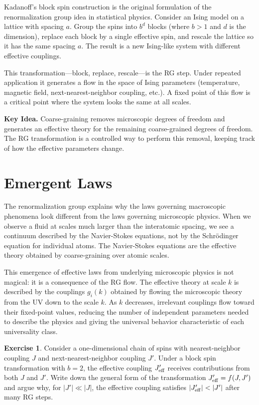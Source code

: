 \documentclass[12pt,a4paper,oneside]{book}
\theoremstyle{definition}
\newtheorem{exercise}{Exercise}[chapter]
\theoremstyle{plain}
\theoremstyle{remark}
\newenvironment{keyidea}{%
  \begin{mdframed}[linecolor=black!40,backgroundcolor=black!4,
    leftmargin=0pt,rightmargin=0pt,innerleftmargin=10pt,
    innerrightmargin=10pt,innertopmargin=8pt,innerbottommargin=8pt]
  \noindent\textbf{Key Idea.}\space}{%
  \end{mdframed}}
\begin{document}
Kadanoff's block spin construction is the original formulation of the
renormalization group idea in statistical physics. Consider an Ising model
on a lattice with spacing $a$. Group the spins into $b^d$ blocks (where
$b > 1$ and $d$ is the dimension), replace each block by a single effective
spin, and rescale the lattice so it has the same spacing $a$. The result is a
new Ising-like system with different effective couplings.

This transformation---block, replace, rescale---is the RG step. Under repeated
application it generates a flow in the space of Ising parameters (temperature,
magnetic field, next-nearest-neighbor coupling, etc.). A fixed point of this
flow is a critical point where the system looks the same at all scales.

\begin{keyidea}
Coarse-graining removes microscopic degrees of freedom and generates an
effective theory for the remaining coarse-grained degrees of freedom.
The RG transformation is a controlled way to perform this removal, keeping
track of how the effective parameters change.
\end{keyidea}

\section{Emergent Laws}

The renormalization group explains why the laws governing macroscopic phenomena
look different from the laws governing microscopic physics. When we observe a
fluid at scales much larger than the interatomic spacing, we see a continuum
described by the Navier-Stokes equations, not by the Schr\"odinger equation for
individual atoms. The Navier-Stokes equations are the effective theory obtained
by coarse-graining over atomic scales.

This emergence of effective laws from underlying microscopic physics is not
magical: it is a consequence of the RG flow. The effective theory at scale $k$
is described by the couplings $g_i(k)$ obtained by flowing the microscopic
theory from the UV down to the scale $k$. As $k$ decreases, irrelevant couplings
flow toward their fixed-point values, reducing the number of independent
parameters needed to describe the physics and giving the universal behavior
characteristic of each universality class.

\begin{exercise}
Consider a one-dimensional chain of spins with nearest-neighbor coupling $J$
and next-nearest-neighbor coupling $J'$. Under a block spin transformation
with $b = 2$, the effective coupling $J'_{\rm eff}$ receives contributions
from both $J$ and $J'$. Write down the general form of the transformation
$J'_{\rm eff} = f(J, J')$ and argue why, for $|J'| \ll |J|$, the effective
coupling satisfies $|J'_{\rm eff}| < |J'|$ after many RG steps.
\end{exercise}
\end{document}
